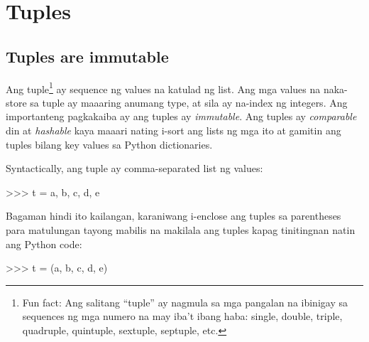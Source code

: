 \documentclass[10pt,]{book}
\newenvironment{Shaded}{}{}
\newcommand{\NormalTok}[1]{#1}
\newcommand{\OperatorTok}[1]{\textcolor[rgb]{0.40,0.40,0.40}{#1}}
\newcommand{\StringTok}[1]{\textcolor[rgb]{0.25,0.44,0.63}{#1}}
\begin{document}
\chapter{Tuples}\label{tuples}

\section{Tuples are immutable}\label{tuples-are-immutable}

  

Ang tuple\footnote{Fun fact: Ang salitang ``tuple'' ay nagmula sa mga
  pangalan na ibinigay sa sequences ng mga numero na may iba't ibang
  haba: single, double, triple, quadruple, quintuple, sextuple,
  septuple, etc.} ay sequence ng values na katulad ng list. Ang mga
values na naka-store sa tuple ay maaaring anumang type, at sila ay
na-index ng integers. Ang importanteng pagkakaiba ay ang tuples ay
\emph{immutable}. Ang tuples ay \emph{comparable} din at \emph{hashable}
kaya maaari nating i-sort ang lists ng mga ito at gamitin ang tuples
bilang key values sa Python dictionaries.

  

Syntactically, ang tuple ay comma-separated list ng values:

\begin{Shaded}
\begin{Highlighting}[]
\OperatorTok{\textgreater{}\textgreater{}\textgreater{}}\NormalTok{ t }\OperatorTok{=} \StringTok{\textquotesingle{}a\textquotesingle{}}\NormalTok{, }\StringTok{\textquotesingle{}b\textquotesingle{}}\NormalTok{, }\StringTok{\textquotesingle{}c\textquotesingle{}}\NormalTok{, }\StringTok{\textquotesingle{}d\textquotesingle{}}\NormalTok{, }\StringTok{\textquotesingle{}e\textquotesingle{}}
\end{Highlighting}
\end{Shaded}

Bagaman hindi ito kailangan, karaniwang i-enclose ang tuples sa
parentheses para matulungan tayong mabilis na makilala ang tuples kapag
tinitingnan natin ang Python code:


\begin{Shaded}
\begin{Highlighting}[]
\OperatorTok{\textgreater{}\textgreater{}\textgreater{}}\NormalTok{ t }\OperatorTok{=}\NormalTok{ (}\StringTok{\textquotesingle{}a\textquotesingle{}}\NormalTok{, }\StringTok{\textquotesingle{}b\textquotesingle{}}\NormalTok{, }\StringTok{\textquotesingle{}c\textquotesingle{}}\NormalTok{, }\StringTok{\textquotesingle{}d\textquotesingle{}}\NormalTok{, }\StringTok{\textquotesingle{}e\textquotesingle{}}\NormalTok{)}
\end{Highlighting}
\end{Shaded}
\end{document}
